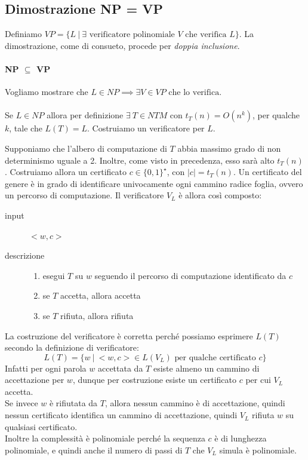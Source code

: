 \subsection{Dimostrazione NP = VP}

Definiamo $VP = \{ L \ | \ \exists \text{ verificatore polinomiale } V \text{ che verifica } L \}$. La dimostrazione, come di consueto, procede per \emph{doppia inclusione}.


\paragraph{NP $\subseteq$ VP}

Vogliamo mostrare che $L \in NP \implies \exists V \in VP \text{ che lo verifica}$.
\\
\\
Se $L \in NP$ allora per definizione $\exists \ T \in NTM$ con $t_T(n) = O(n^k)$, per qualche $k$, tale che $L(T) = L$. Costruiamo un verificatore per $L$.

Supponiamo che l'albero di computazione di $T$ abbia massimo grado di non determinismo uguale a 2. Inoltre, come visto in precedenza, esso sarà alto $t_T(n)$.
Costruiamo allora un certificato $c \in \{0,1\}^{\star}$, con $|c| = t_T(n)$. Un certificato del genere è in grado di identificare univocamente ogni cammino radice foglia, ovvero un percorso di computazione. Il verificatore $V_L$ è allora così composto:
\begin{description}
	\item[input] $<w, c>$
	\item[descrizione]
	\begin{enumerate}
		\item esegui $T$ su $w$ seguendo il percorso di computazione identificato da $c$
		\item se $T$ accetta, allora accetta
		\item se $T$ rifiuta, allora rifiuta
	\end{enumerate}
\end{description}

La costruzione del verificatore è corretta perché possiamo esprimere $L(T)$ secondo la definizione di verificatore:
\[
	L(T) = \{w \ |\ <w, c > \in L(V_L) \text{ per qualche certificato } c \}
\]
Infatti per ogni parola $w$ accettata da $T$ esiste almeno un cammino di accettazione per $w$, dunque per costruzione esiste un
certificato $c$ per cui $V_L$ accetta. 
\\
Se invece $w$ è rifiutata da $T$, allora nessun cammino è di accettazione, quindi nessun certificato identifica un cammino di accettazione, quindi $V_L$ rifiuta $w$ su qualsiasi certificato.
\\
Inoltre la complessità è polinomiale perché la sequenza $c$ è di lunghezza polinomiale, e quindi anche il numero di passi di $T$ che $V_L$ simula è polinomiale.

